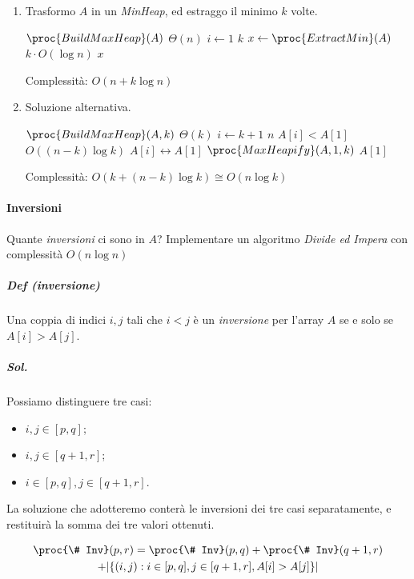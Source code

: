\begin{enumerate}[label=($\arabic*$)]
	\item Trasformo $A$ in un \emph{MinHeap}, ed estraggo il minimo $k$ volte.
	\begin{codebox}
	\li	$\proc{BuildMaxHeap}(A)$ \Comment $\Theta(n)$
	\li \For $i \gets 1$ \To $k$
	\li \Do
			$x \gets \proc{ExtractMin}(A)$ \Comment $k \cdot O(\log n)$
		\End
	\li \Return $x$
	\end{codebox}

	Complessità: $O(n + k \log n)$

	\item Soluzione alternativa.
	\begin{codebox}
		\Procname{\proc{Select}$(A,k)$}
		\li	$\proc{BuildMaxHeap}(A,k)$ \Comment $\Theta(k)$
		\li \For $i \gets k+1$ \To $n$
		\li \Do
				\If $A[i] < A[1]$ \Comment $O((n-k) \log k)$
		\li		\Then
					$A[i] \leftrightarrow A[1]$
		\li			$\proc{MaxHeapify}(A,1,k)$
				\End
			\End
		\li \Return $A[1]$
	\end{codebox}

	Complessità: $O(k + (n-k) \log k) \cong O(n \log k)$
\end{enumerate}

\paragraph{Inversioni} Quante \emph{inversioni} ci sono in $A$? Implementare un algoritmo
\emph{Divide ed Impera} con complessità $O(n \log n)$ 

\subparagraph{Def (inversione)} Una coppia di indici $i, j$ tali che $i < j$ è un \emph{inversione}
per l'array $A$ se e solo se $A[i] > A[j]$.

\subparagraph{Sol.} Possiamo distinguere tre casi:
\begin{itemize}
	\item $i,j \in [p,q]$;
	\item $i, j \in [q+1,r]$;
	\item $i \in [p,q], j \in [q+1,r]$.
\end{itemize}

La soluzione che adotteremo conterà le inversioni dei tre casi separatamente, e restituirà
la somma dei tre valori ottenuti.

\begin{multline*}
	\proc{\# Inv}(p,r) = \proc{\# Inv}(p,q) + \proc{\# Inv}(q+1,r) \\
	+ | \{ (i,j) : i \in [p,q], j \in [q+1,r], A[i] > A[j] \} |
\end{multline*}

